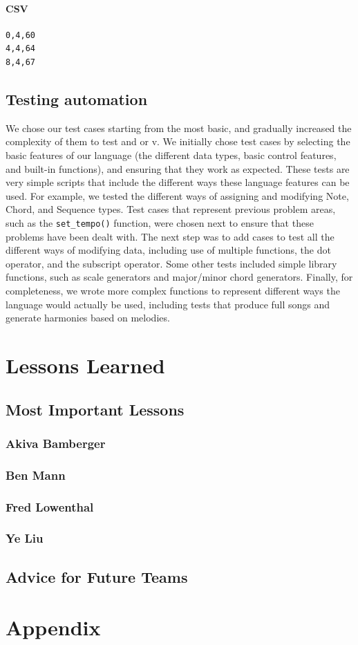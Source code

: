 \documentclass[12pt,A4]{book}
\begin{document}
\subsubsection{CSV}
\begin{verbatim}
0,4,60
4,4,64
8,4,67
\end{verbatim}

\section{Testing automation}
We chose our test cases starting from the most basic, and gradually increased the complexity of them to test and or v.  We initially chose test cases by selecting the basic features of our language (the different data types, basic control features, and built-in functions), and ensuring that they work as expected.  These tests are very simple scripts that include the different ways these language features can be used. For example, we tested the different ways of assigning and modifying Note, Chord, and Sequence types. Test cases that represent previous problem areas, such as the \verb|set_tempo()| function, were chosen next to ensure that these problems have been dealt with.  The next step was to add cases to test all the different ways of modifying data, including use of multiple functions, the dot operator, and the subscript operator.  Some other tests included simple library functions, such as scale generators and major/minor chord generators.  Finally, for completeness, we wrote more complex functions to represent different ways the language would actually be used, including tests that produce full songs and generate harmonies based on melodies.

\chapter{Lessons Learned}
\section{Most Important Lessons}
\subsection{Akiva Bamberger}
\subsection{Ben Mann}
\subsection{Fred Lowenthal}
\subsection{Ye Liu}
\section{Advice for Future Teams}
\chapter{Appendix}
\end{document}
